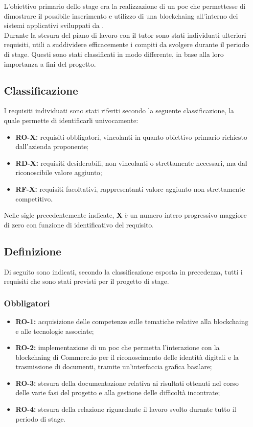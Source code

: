 L'obiettivo primario dello stage era la realizzazione di un \gls{poc} che permettesse di dimostrare il possibile inserimento e utilizzo di una \gls{blockchaing} all'interno dei sistemi applicativi sviluppati da \myCompany{} \companyTitle.\\
Durante la stesura del piano di lavoro con il tutor \myTutor sono stati individuati ulteriori requisiti, utili a suddividere efficacemente i compiti da svolgere durante il periodo di stage. Questi sono stati classificati in modo differente, in base alla loro importanza a fini del progetto.

\subsection{Classificazione}
I requisiti individuati sono stati riferiti secondo la seguente classificazione, la quale permette di identificarli univocamente:
\begin{itemize}
	\item \textbf{RO-X:} requisiti obbligatori, vincolanti in quanto obiettivo primario richiesto dall'azienda proponente;
	\item \textbf{RD-X:} requisiti desiderabili, non vincolanti o strettamente necessari, ma dal riconoscibile valore aggiunto;
	\item \textbf{RF-X:} requisiti facoltativi, rappresentanti valore aggiunto non strettamente competitivo.
\end{itemize}

Nelle sigle precedentemente indicate, \textbf{X} è un numero intero progressivo maggiore di zero con funzione di identificativo del requisito.

\subsection{Definizione}
Di seguito sono indicati, secondo la classificazione esposta in precedenza, tutti i requisiti che sono stati previsti per il progetto di stage.

\subsubsection*{Obbligatori}
\begin{itemize}
	\item \textbf{RO-1:} acquisizione delle competenze sulle tematiche relative alla \gls{blockchaing} e alle tecnologie associate;
	\item \textbf{RO-2:} implementazione di un \gls{poc} che permetta l'interazione con la \gls{blockchaing} di Commerc.io per il riconoscimento delle identità digitali e la trasmissione di documenti, tramite un'interfaccia grafica basilare;
	\item \textbf{RO-3:} stesura della documentazione relativa ai risultati ottenuti nel corso delle varie fasi del progetto e alla gestione delle difficoltà incontrate;
	\item \textbf{RO-4:} stesura della relazione riguardante il lavoro svolto durante tutto il periodo di stage.
\end{itemize}

